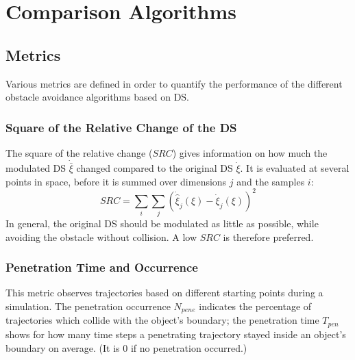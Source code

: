\section{Comparison Algorithms} \label{sec:comparison}
\subsection{Metrics}
Various metrics are defined in order to quantify the performance of the different obstacle avoidance algorithms based on DS.

\subsubsection{Square of the Relative Change of the DS}
The square of the relative change ($SRC$) gives information on how much the modulated DS $\dot{\bar \xi}$ changed compared to the original DS $\dot \xi$. It is evaluated at several points in space, before it is summed over dimensions $j$ and the samples $i$:
\begin{equation}
SRC = \sum_i \sum_j \left( \dot{\hat{\xi}}_j(\xi) - \dot{\xi}_j(\xi) \right)^2
\end{equation}
In general, the original DS should be modulated as little as possible, while avoiding the obstacle without collision. A low $SRC$ is therefore preferred.

\subsubsection{Penetration Time and Occurrence} This metric observes trajectories based on different starting points during a simulation. The penetration occurrence $N_{pene}$ indicates the percentage of trajectories which collide with the object's boundary; the penetration time $T_{pen}$ shows for how many time steps a penetrating trajectory stayed inside an object's boundary on average. (It is 0 if no penetration occurred.)

